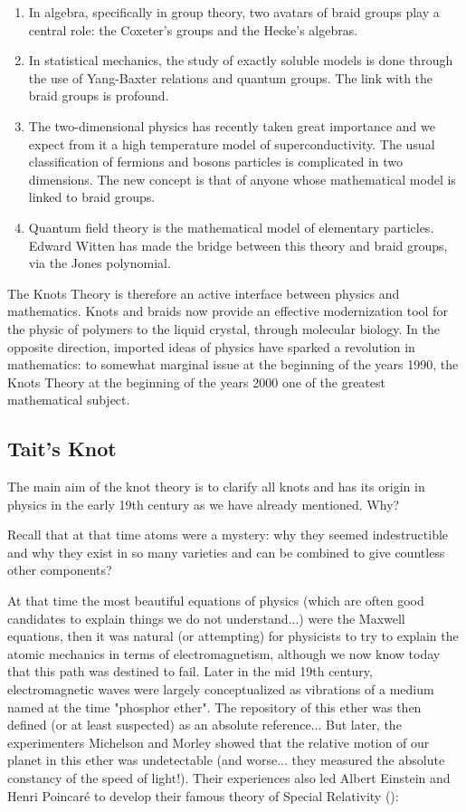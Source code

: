 {\begin{enumerate}
		\item In algebra, specifically in group theory, two avatars of braid groups play a central role: the Coxeter's groups and the Hecke's algebras.
		
		\item In statistical mechanics, the study of exactly soluble models is done through the use of Yang-Baxter relations and quantum groups. The link with the braid groups is profound.
		
		\item The two-dimensional physics has recently taken great importance and we expect from it a high temperature model of superconductivity. The usual classification of fermions and bosons particles is complicated in two dimensions. The new concept is that of anyone whose mathematical model is linked to braid groups.
		
		\item Quantum field theory is the mathematical model of elementary particles. Edward Witten has made the bridge between this theory and braid groups, via the Jones polynomial.
	\end{enumerate}
	The Knots Theory is therefore an active interface between physics and mathematics. Knots and braids now provide an effective modernization tool for the physic of polymers to the liquid crystal, through molecular biology. In the opposite direction, imported ideas of physics have sparked a revolution in mathematics: to somewhat marginal issue at the beginning of the years 1990, the Knots Theory at the beginning of the years 2000 one of the greatest mathematical subject.
	
	\subsection{Tait's Knot}
	The main aim of the knot theory is to clarify all knots and has its origin in physics in the early 19th century as we have already mentioned. Why?
	
	Recall that at that time atoms were a mystery: why they seemed indestructible and why they exist in so many varieties and can be combined to give countless other components?
	
	At that time the most beautiful equations of physics (which are often good candidates to explain things we do not understand...) were the Maxwell equations, then it was natural (or attempting) for physicists to try to explain the atomic mechanics in terms of electromagnetism, although we now know today that this path was destined to fail. Later in the mid 19th century, electromagnetic waves were largely conceptualized as vibrations of a medium named at the time "phosphor ether". The repository of this ether was then defined (or at least suspected) as an absolute reference... But later, the experimenters Michelson and Morley showed that the relative motion of our planet in this ether was undetectable (and worse... they measured the absolute constancy of the speed of light!). Their experiences also led Albert Einstein and Henri Poincaré to develop their famous theory of Special Relativity ():
	
}
